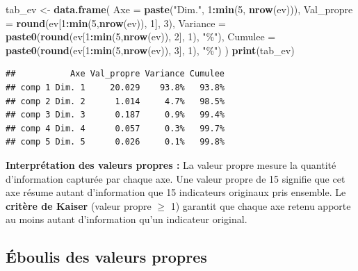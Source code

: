\documentclass[
]{article}
\newenvironment{Shaded}{\begin{snugshade}}{\end{snugshade}}
\newcommand{\AttributeTok}[1]{\textcolor[rgb]{0.13,0.29,0.53}{#1}}
\newcommand{\DecValTok}[1]{\textcolor[rgb]{0.00,0.00,0.81}{#1}}
\newcommand{\FunctionTok}[1]{\textcolor[rgb]{0.13,0.29,0.53}{\textbf{#1}}}
\newcommand{\NormalTok}[1]{#1}
\newcommand{\OtherTok}[1]{\textcolor[rgb]{0.56,0.35,0.01}{#1}}
\newcommand{\SpecialCharTok}[1]{\textcolor[rgb]{0.81,0.36,0.00}{\textbf{#1}}}
\newcommand{\StringTok}[1]{\textcolor[rgb]{0.31,0.60,0.02}{#1}}
\begin{document}
\begin{Shaded}
\begin{Highlighting}[]
\NormalTok{tab\_ev }\OtherTok{\textless{}{-}} \FunctionTok{data.frame}\NormalTok{(}
  \AttributeTok{Axe        =} \FunctionTok{paste}\NormalTok{(}\StringTok{"Dim."}\NormalTok{, }\DecValTok{1}\SpecialCharTok{:}\FunctionTok{min}\NormalTok{(}\DecValTok{5}\NormalTok{, }\FunctionTok{nrow}\NormalTok{(ev))),}
  \AttributeTok{Val\_propre =} \FunctionTok{round}\NormalTok{(ev[}\DecValTok{1}\SpecialCharTok{:}\FunctionTok{min}\NormalTok{(}\DecValTok{5}\NormalTok{,}\FunctionTok{nrow}\NormalTok{(ev)), }\DecValTok{1}\NormalTok{], }\DecValTok{3}\NormalTok{),}
  \AttributeTok{Variance   =} \FunctionTok{paste0}\NormalTok{(}\FunctionTok{round}\NormalTok{(ev[}\DecValTok{1}\SpecialCharTok{:}\FunctionTok{min}\NormalTok{(}\DecValTok{5}\NormalTok{,}\FunctionTok{nrow}\NormalTok{(ev)), }\DecValTok{2}\NormalTok{], }\DecValTok{1}\NormalTok{), }\StringTok{"\%"}\NormalTok{),}
  \AttributeTok{Cumulee    =} \FunctionTok{paste0}\NormalTok{(}\FunctionTok{round}\NormalTok{(ev[}\DecValTok{1}\SpecialCharTok{:}\FunctionTok{min}\NormalTok{(}\DecValTok{5}\NormalTok{,}\FunctionTok{nrow}\NormalTok{(ev)), }\DecValTok{3}\NormalTok{], }\DecValTok{1}\NormalTok{), }\StringTok{"\%"}\NormalTok{)}
\NormalTok{)}
\FunctionTok{print}\NormalTok{(tab\_ev)}
\end{Highlighting}
\end{Shaded}

\begin{verbatim}
##           Axe Val_propre Variance Cumulee
## comp 1 Dim. 1     20.029    93.8%   93.8%
## comp 2 Dim. 2      1.014     4.7%   98.5%
## comp 3 Dim. 3      0.187     0.9%   99.4%
## comp 4 Dim. 4      0.057     0.3%   99.7%
## comp 5 Dim. 5      0.026     0.1%   99.8%
\end{verbatim}

\textbf{Interprétation des valeurs propres :} La valeur propre mesure la
quantité d'information capturée par chaque axe. Une valeur propre de 15
signifie que cet axe résume autant d'information que 15 indicateurs
originaux pris ensemble. Le \textbf{critère de Kaiser} (valeur propre
\(\geq\) 1) garantit que chaque axe retenu apporte au moins autant
d'information qu'un indicateur original.

\subsection{Éboulis des valeurs
propres}\label{uxe9boulis-des-valeurs-propres}
\end{document}
